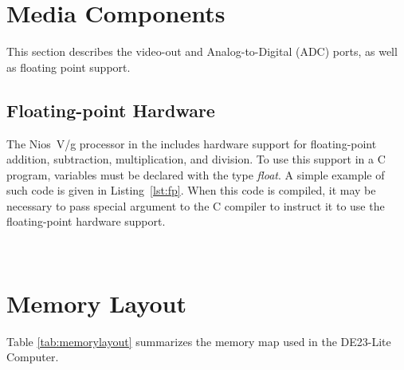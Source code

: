 \documentclass[11pt, twoside, pdftex]{article}
\newcommand{\commonFiles}{../../../common/doc}
\newcommand{\systemName}{DE23-Lite Computer}
\begin{document}
\section{Media Components}
\label{sec:multi}

This section describes the video-out and Analog-to-Digital (ADC) ports,
as well as floating point support.




\subsection{Floating-point Hardware}
\label{sec:fp}

The Nios~V/g processor in the includes hardware support for
floating-point addition, subtraction, multiplication, and division. To use this support in
a C program, variables must be declared with the type {\it float}. A simple example of 
such code is given in Listing~\ref{lst:fp}. When this code is compiled, it may be necessary 
to pass special argument to the C compiler to instruct it to 
use the floating-point hardware support.





~\\
\newpage
\section{Memory Layout}

\noindent
Table \ref{tab:memorylayout} summarizes the memory map used in the \systemName.
~\\
~\\
\end{document}
